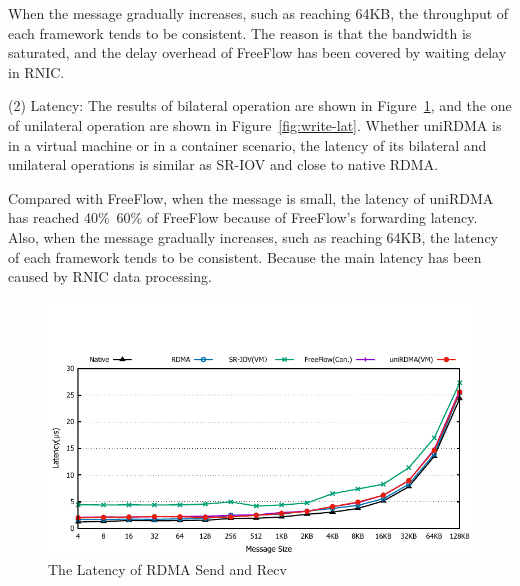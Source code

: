 When the message gradually increases, such as reaching 64KB, the throughput of each framework tends to be consistent. The reason is that the bandwidth is saturated, and the delay overhead of FreeFlow has been covered by waiting delay in RNIC.

(2) Latency: The results of bilateral operation are shown in Figure~\ref{fig:send-lat}, and the one of unilateral operation are shown in Figure~\ref{fig:write-lat}. Whether uniRDMA is in a virtual machine or in a container scenario, the latency of its bilateral and unilateral operations is similar as SR-IOV and close to native RDMA.

Compared with FreeFlow, when the message is small, the latency of uniRDMA has reached 40\%~60\% of FreeFlow because of FreeFlow's forwarding latency. Also, when the message gradually increases, such as reaching 64KB, the latency of each framework tends to be consistent. Because the main latency has been caused by RNIC data processing.

\begin{figure}[!ht]
	\centering
	\includegraphics[width=1.0\linewidth]{images/send-lat.pdf}
	\caption{The Latency of RDMA Send and Recv}
	\label{fig:send-lat}
\end{figure}

